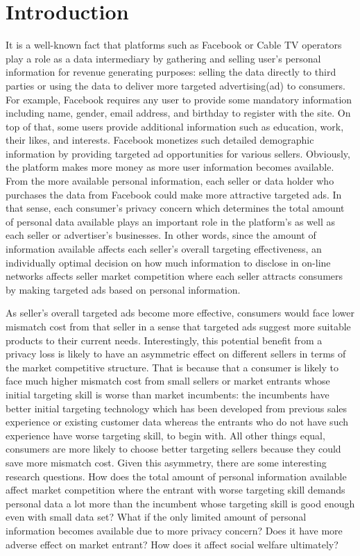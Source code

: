 \documentclass[12pt]{article}
\begin{document}
\section{Introduction}



It is a well-known fact that platforms such as Facebook or Cable TV operators play a role as a data intermediary by gathering and selling user's personal information for revenue generating purposes: selling the data directly to third parties or using the data to deliver more targeted advertising(ad) to consumers. For example, Facebook requires any user to provide some mandatory information including name, gender, email address, and birthday to register with the site. On top of that, some users provide additional information such as education, work, their likes, and interests. Facebook monetizes such detailed demographic information by providing targeted ad opportunities for various sellers. Obviously, the platform makes more money as more user information becomes available. From the more available personal information, each seller or data holder who purchases the data from Facebook could make more attractive targeted ads. In that sense, each consumer's privacy concern which determines the total amount of personal data available plays an important role in the platform's as well as each seller or advertiser's businesses. In other words, since the amount of information available affects each seller's overall targeting effectiveness, an individually optimal decision on how much information to disclose in on-line networks affects seller market competition where each seller attracts consumers by making targeted ads based on personal information.

As seller's overall targeted ads become more effective, consumers would face lower mismatch cost from that seller in a sense that targeted ads suggest more suitable products to their current needs. Interestingly, this potential benefit from a privacy loss is likely to have an asymmetric effect on different sellers in terms of the market competitive structure. That is because that a consumer is likely to face much higher mismatch cost from small sellers or market entrants whose initial targeting skill is worse than market incumbents: the incumbents have better initial targeting technology which has been developed from previous sales experience or existing customer data whereas the entrants who do not have such experience have worse targeting skill, to begin with. All other things equal, consumers are more likely to choose better targeting sellers because they could save more mismatch cost.  Given this asymmetry, there are some interesting research questions. How does the total amount of personal information available affect market competition where the entrant with worse targeting skill demands personal data a lot more than the incumbent whose targeting skill is good enough even with small data set? What if the only limited amount of personal information becomes available due to more privacy concern? Does it have more adverse effect on market entrant? How does it affect social welfare ultimately? 
\end{document}
